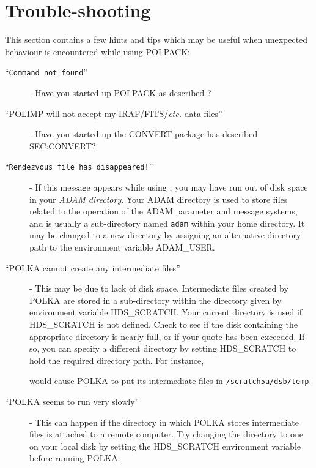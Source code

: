 \documentclass[twoside,11pt]{starlink}
\begin{document}
\section{\label{SEC:TROUBLE}Trouble-shooting}
This section contains a few hints and tips which may be useful when
unexpected behaviour is encountered while using POLPACK:

\begin{description}

\item [``\texttt{Command not found}''] - Have you started up POLPACK
as described ?

\item [``POLIMP will not accept my IRAF/FITS/\emph{etc.} data files''] - Have
you started up the CONVERT package has described 
{}{SEC:CONVERT}?

\item [``\texttt{Rendezvous file has disappeared!}''] - If this message
appears while using , you may have run out of disk
space in your \emph{ADAM directory}. Your ADAM directory is used to store
files related to the operation of the ADAM parameter and message systems,
and is usually a sub-directory named \texttt{adam} within your home
directory. It may be changed to a new directory by assigning an
alternative directory path to the environment variable ADAM\_USER.

\item [``POLKA cannot create any intermediate files''] - This may be due
to lack of disk space. Intermediate files created by POLKA are stored
in a sub-directory within the directory given by environment variable
HDS\_SCRATCH. Your current directory is used if HDS\_SCRATCH is not
defined. Check to see if the disk containing the appropriate directory is
nearly full, or if your quote has been exceeded. If so, you can specify a
different directory by setting HDS\_SCRATCH to hold the required directory
path. For instance,

\begin{terminalv}
\end{terminalv}

would cause POLKA to put its intermediate files in \texttt{/scratch5a/dsb/temp}.

\item [``POLKA seems to run very slowly''] - This can happen if the
directory in which POLKA stores intermediate files is attached to a remote
computer. Try changing the directory to one on your local disk by setting
the HDS\_SCRATCH environment variable before running POLKA.


\end{description}
\end{document}
